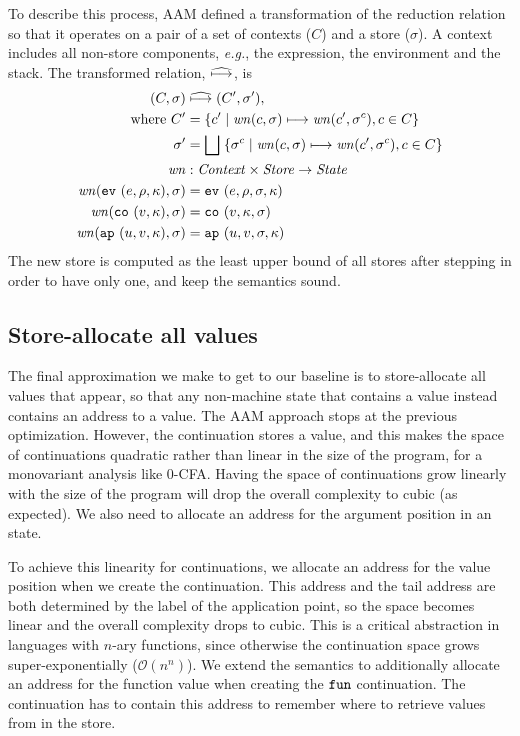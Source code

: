 \documentclass[preprint,onecolumn,9pt]{sigplanconf} %
\begin{document}
To describe this process, AAM defined a transformation of the reduction relation so that it operates on
a pair of a set of contexts ($C$) and a store ($\sigma$).
%
A context includes all non-store components, \emph{e.g.}, the expression, the environment and the stack.
%
The transformed relation, $\widehat{\mathbin{\longmapsto}}$, is
%
{\small
\begin{align*}
(C, \sigma) &\mathrel{\widehat{\mathbin{\longmapsto}}} (C', \sigma'), \\
\mbox{where } C' &= \{c' \mid \mathit{wn}(c, \sigma) \mathrel{\mathbin{\longmapsto}} \mathit{wn}(c', \sigma^c), c \in C\} \\
              \sigma' &= \bigsqcup\; \{\sigma^c \mid \mathit{wn}(c,\sigma)\mathrel{\mathbin{\longmapsto}} \mathit{wn}(c', \sigma^c), c \in C\} \\
\mathit{wn} &: \mathit{Context} \times \mathit{Store} \to \mathit{State} \\
\mathit{wn}({\tt ev}{\ }({e, \rho, \kappa}), \sigma) &= {\tt ev}{\ }({e, \rho, \sigma, \kappa}) \\
\mathit{wn}({\tt co}{\ }({v, \kappa}), \sigma) &= {\tt co}{\ }({v, \kappa, \sigma}) \\
\mathit{wn}({\tt ap}{\ }({u, v, \kappa}), \sigma) &= {\tt ap}{\ }({u, v, \sigma, \kappa}) \\
\end{align*}}
%
The new store is computed as the least upper bound of all
stores after stepping in order to have only one, and keep the
semantics sound.

\subsection{Store-allocate all values}
\label{sec:baselineeval}

The final approximation we make to get to our baseline is to
store-allocate all values that appear, so that any non-machine state
that contains a value instead contains an address to a value.  The AAM
approach stops at the previous optimization.  However, the \kfnalone
continuation stores a value, and this makes the space of continuations
quadratic rather than linear in the size of the program, for a
monovariant analysis like 0-CFA.  Having the space of continuations
grow linearly with the size of the program will drop the overall
complexity to cubic (as expected). We also need to allocate an address
for the argument position in an \apalone state.

To achieve this linearity for continuations, we allocate an address
for the value position when we create the continuation.  This address
and the tail address are both determined by the label of the
application point, so the space becomes linear and the overall
complexity drops to cubic.  This is a critical abstraction in
languages with $n$-ary functions, since otherwise the continuation
space grows super-exponentially (${\mathcal O}(n^n)$). We extend the semantics to
additionally allocate an address for the function value when creating
the ${\tt fun}$ continuation. The continuation has to contain this address
to remember where to retrieve values from in the store.
\end{document}
